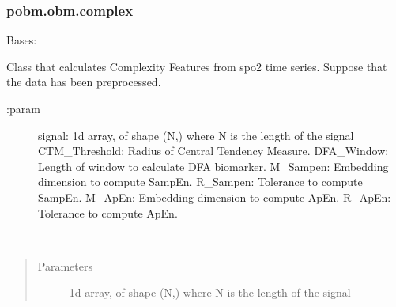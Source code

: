 \documentclass[letterpaper,10pt,english]{sphinxmanual}
\begin{document}
\subsubsection{pobm.obm.complex}
\label{\detokenize{pobm.obm:module-pobm.obm.complex}}\label{\detokenize{pobm.obm:pobm-obm-complex}}

\begin{fulllineitems}
\label{\detokenize{pobm.obm:pobm.obm.complex.ComplexityMeasures}}
Bases: 

Class that calculates Complexity Features from spo2 time series.
Suppose that the data has been preprocessed.
\begin{description}
\item[{:param}] \leavevmode
signal: 1\sphinxhyphen{}d array, of shape (N,) where N is the length of the signal
CTM\_Threshold: Radius of Central Tendency Measure.
DFA\_Window: Length of window to calculate DFA biomarker.
M\_Sampen: Embedding dimension to compute SampEn.
R\_Sampen: Tolerance to compute SampEn.
M\_ApEn: Embedding dimension to compute ApEn.
R\_ApEn: Tolerance to compute ApEn.

\end{description}

\begin{fulllineitems}
\label{\detokenize{pobm.obm:pobm.obm.complex.ComplexityMeasures.compute}}~\begin{quote}\begin{description}
\item[{Parameters}] \leavevmode
{} \textendash{} 1\sphinxhyphen{}d array, of shape (N,) where N is the length of the signal


\end{description}
\end{quote}
\end{fulllineitems}
\end{fulllineitems}
\end{document}
